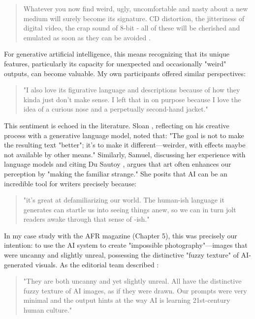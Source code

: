 \begin{quote}
    Whatever you now find weird, ugly, uncomfortable and nasty about a new medium will surely become its signature. CD distortion, the jitteriness of digital video, the crap sound of 8-bit - all of these will be cherished and emulated as soon as they can be avoided \cite{Eno2007-fl}.
\end{quote}

For generative artificial intelligence, this means recognizing that its unique features, particularly its capacity for unexpected and occasionally "weird" outputs, can become valuable. My own participants offered similar perspectives:

\begin{quote}
"I also love its figurative language and descriptions because of how they kinda just don't make sense. I left that in on purpose because I love the idea of a curious nose and a perpetually second-hand jacket."
\end{quote}

This sentiment is echoed in the literature. Sloan \cite{Sloan2016-fj}, reflecting on his creative process with a generative language model, noted that: "The goal is not to make the resulting text "better"; it's to make it different—weirder, with effects maybe not available by other means." Similarly, Samuel, discussing her experience with language models and citing Du Sautoy \cite{Samuel2019-gc}, argues that art often enhances our perception by "making the familiar strange." She posits that AI can be an incredible tool for writers precisely because:

\begin{quote}
"it's great at defamiliarizing our world. The human-ish language it generates can startle us into seeing things anew, so we can in turn jolt readers awake through that sense of -ish."
\end{quote}

In my case study with the AFR magazine (Chapter 5), this was precisely our intention: to use the AI system to create "impossible photography"—images that were uncanny and slightly unreal, possessing the distinctive "fuzzy texture" of AI-generated visuals. As the editorial team described \cite{Drummond2023-av}:

\begin{quote}
"They are both uncanny and yet slightly unreal. All have the distinctive fuzzy texture of AI images, as if they were drawn. Our prompts were very minimal and the output hints at the way AI is learning 21st-century human culture."
\end{quote}

